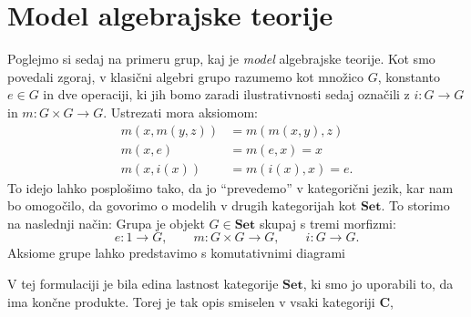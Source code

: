 \documentclass[../kategoricna_logika.tex]{subfiles}
\begin{document}
\section{Model algebrajske teorije}
Poglejmo si sedaj na primeru grup, kaj je \emph{model} algebrajske teorije.
Kot smo povedali zgoraj, v klasični algebri grupo razumemo kot množico $G$,
konstanto $e \in G$ in dve operaciji, ki jih bomo zaradi ilustrativnosti sedaj
označili z $i : G \to G$ in $m : G \times G \to G$. Ustrezati mora aksiomom:
\begin{align*}
   m(x,m(y,z)) &= m(m(x,y),z) \\
   m(x,e) &= m(e,x) = x \\
   m(x,i(x)) &= m(i(x),x) = e.
\end{align*}
%
To idejo lahko posplošimo tako, da jo ``prevedemo'' v
kategorični jezik, kar nam bo omogočilo, da govorimo o modelih v drugih
kategorijah kot $\mathbf{Set}$. To storimo na naslednji način:
Grupa je objekt $G \in \mathbf{Set}$ skupaj s tremi morfizmi:
\[ e : 1 \to G, \qquad m : G \times G \to G, \qquad i : G \to G. \]
Aksiome grupe lahko predstavimo s komutativnimi diagrami
\begin{center}
\end{center}
\begin{center}
\end{center}
\begin{center}
\end{center}
%
V tej formulaciji je bila edina lastnost kategorije $\mathbf{Set}$, ki smo jo uporabili to,
da ima končne produkte. Torej je tak opis smiselen v vsaki kategoriji $\mathbf{C}$,
\end{document}
